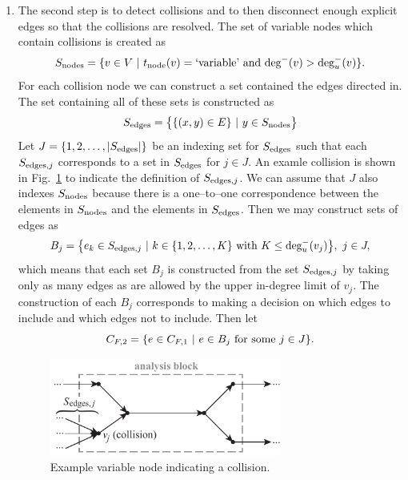 \begin{enumerate}
\item The second step is to detect collisions and to then disconnect enough explicit edges so that the collisions are resolved. The set of variable nodes which contain collisions is created as
\begin{equation}
S_\textrm{nodes} = \{v \in V \ | \  t_\textrm{node}(v) = \textrm{`variable'} \textrm{ and } \textrm{deg}^-(v) > \textrm{deg}_u^-(v) \}.
\end{equation}
For each collision node we can construct a set contained the edges directed in. The set containing all of these sets is constructed as
\begin{equation}
S_\textrm{edges} = \big \{ \{(x,y) \in E\} \ | \  y \in S_\textrm{nodes} \big \}
\end{equation}
Let $J=\{1,2,\ldots,|S_\textrm{edges}|\}$ be an indexing set for $S_\textrm{edges}$ such that each $S_{\textrm{edges},j}$ corresponds to a set in $S_\textrm{edges}$ for $j \in J$. An examle collision is shown in Fig.~\ref{f:collision} to indicate the definition of $S_{\textrm{edges},j}$. We can assume that $J$ also indexes $S_\textrm{nodes}$ because there is a one--to--one correspondence between the elements in $S_\textrm{nodes}$ and the elements in $S_\textrm{edges}$. Then we may construct sets of edges as
\begin{equation}
B_j = \big \{e_k \in S_{\textrm{edges},j} \ | \  k \in \{1,2,\ldots,K\} \textrm{ with } K \leq \textrm{deg}_u^-(v_j) \big \}, \ j \in J,
\end{equation}
which means that each set $B_j$ is constructed from the set $S_{\textrm{edges},j}$ by taking only as many edges as are allowed by the upper in-degree limit of $v_j$. The construction of each $B_j$ corresponds to making a decision on which edges to include and which edges not to include. Then let
\begin{equation}
C_{F,2} = \{ e \in C_{F,1} \ | \  e \in B_j \textrm{ for some } j \in J\}.
\end{equation}
\begin{figure}[htb!]
	\begin{center}
	\includegraphics[width=3in]{images/analysis_block_collision}
	\end{center}
	\vspace{-20pt}
\caption{Example variable node indicating a collision.}
\label{f:collision}
\end{figure}


\end{enumerate}
